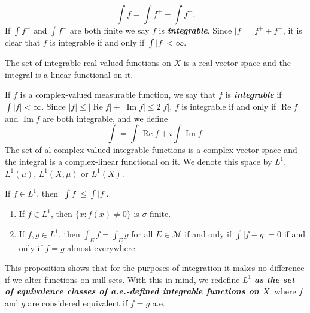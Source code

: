 \documentclass{article}
\theoremstyle{definition}
\numberwithin{equation}{section}
\begin{document}
		\[\int f=\int f^+-\int f^-.\]
		If $\int f^+$ and $\int f^-$ are both finite we say $f$ is \textbf{\textit{integrable}}. Since $|f|=f^++f^-$, it is clear that $f$ is integrable if and only if $\int|f|<\infty$.
		\begin{prop}
			The set of integrable real-valued functions on $X$ is a real vector space and the integral is a linear functional on it.
		\end{prop}
		If $f$ is a complex-valued measurable function, we say that $f$ is \textbf{\textit{integrable}} if $\int|f|<\infty$. Since $|f|\leq|\operatorname{Re}f|+|\operatorname{Im}f|\leq2|f|$, $f$ is integrable if and only if $\operatorname{Re}f$ and $\operatorname{Im}f$ are both integrable, and we define
		\[\int=\int\operatorname{Re}f+i\int\operatorname{Im}f.\]
		The set of al complex-valued integrable functions is a complex vector space and the integral is a complex-linear functional on it. We denote this space by $L^1$, $L^1(\mu)$, $L^1(X,\mu)$ or $L^1(X)$.
		\begin{prop}
			If $f\in L^1$, then $|\int f|\leq \int|f|$.
		\end{prop}
		\begin{prop}\leavevmode
			\begin{enumerate}
				\item If $f\in L^1$, then $\{x:f(x)\neq0\}$ is $\sigma$-finite.
				\item If $f,g\in L^1$, then $\int_E f=\int_E g$ for all $E\in\mathcal{M}$ if and only if $\int|f-g|=0$ if and only if $f=g$ almost everywhere.
			\end{enumerate}
		\end{prop}
		This proposition shows that for the purposes of integration it makes no difference if we alter functions on null sets. With this in mind, we redefine $L^1$ \textbf{\textit{as the set of equivalence classes of a.e.-defined integrable functions on $X$}}, where $f$ and $g$ are considered equivalent if $f=g$ a.e.
		
\end{document}
